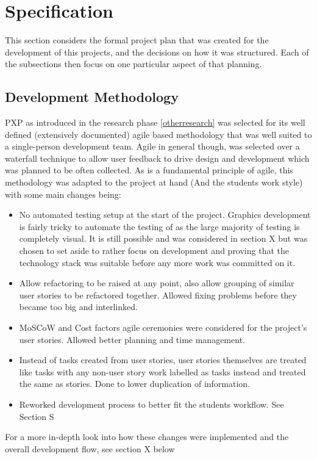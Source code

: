 \section{Specification}
This section considers the formal project plan that was created for the development of this projects, and the decisions on how it was structured. Each of the subsections then focus on one particular aspect of that planning.

\subsection{Development Methodology}
PXP as introduced in the research phase \ref{otherresearch} was selected for its well defined (extensively documented) agile based methodology that was well suited to a single-person development team. Agile in general though, was selected over a waterfall technique to allow user feedback to drive design and development which was planned to be often collected.
As is a fundamental principle of agile, this methodology was adapted to the project at hand (And the students work style) with some main changes being:
\begin{itemize}
    \item No automated testing setup at the start of the project. Graphics development is fairly tricky to automate the testing of as the large majority of testing is completely visual. It is still possible and was considered in section X but was chosen to set aside to rather focus on development and proving that the technology stack was suitable before any more work was committed on it.
    \item Allow refactoring to be raised at any point, also allow grouping of similar user stories to be refactored together. Allowed fixing problems before they became too big and interlinked.
    \item MoSCoW and Cost factors agile ceremonies were considered for the project’s user stories. Allowed better planning and time management.
    \item Instead of tasks created from user stories, user stories themselves are treated like tasks with any non-user story work labelled as tasks instead and treated the same as stories. Done to lower duplication of information.
    \item Reworked development process to better fit the students workflow. See Section S
\end{itemize}

For a more in-depth look into how these changes were implemented and the overall development flow, see section X below

